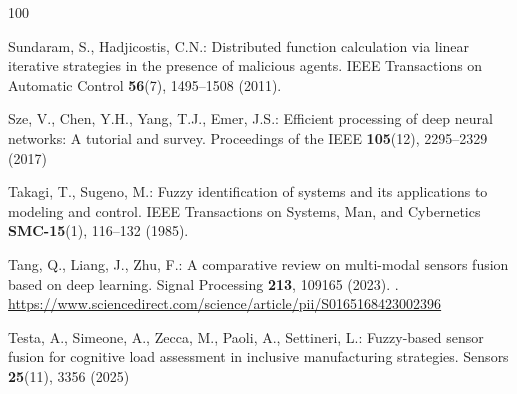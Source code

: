 \documentclass[graybox,envcountchap]{style/SNmono}
\begin{document}
\begin{thebibliography}{100}
{\par}

Sundaram, S., Hadjicostis, C.N.: Distributed function calculation via linear
  iterative strategies in the presence of malicious agents.
\newblock IEEE Transactions on Automatic Control \textbf{56}(7), 1495--1508
  (2011).
\newblock {}


{\color{red} 
Sze, V., Chen, Y.H., Yang, T.J., Emer, J.S.: Efficient processing of deep
  neural networks: A tutorial and survey.
\newblock Proceedings of the IEEE \textbf{105}(12), 2295--2329 (2017)

\par}

Takagi, T., Sugeno, M.: Fuzzy identification of systems and its applications to
  modeling and control.
\newblock IEEE Transactions on Systems, Man, and Cybernetics
  \textbf{SMC-15}(1), 116--132 (1985).
\newblock {}



Tang, Q., Liang, J., Zhu, F.: A comparative review on multi-modal sensors
  fusion based on deep learning.
\newblock Signal Processing \textbf{213}, 109165 (2023).
\newblock {}.
\newblock
  \urlprefix\url{https://www.sciencedirect.com/science/article/pii/S0165168423002396}


{\color{red} 
Testa, A., Simeone, A., Zecca, M., Paoli, A., Settineri, L.: Fuzzy-based sensor
  fusion for cognitive load assessment in inclusive manufacturing strategies.
\newblock Sensors \textbf{25}(11), 3356 (2025)

\par}
\end{thebibliography}
\end{document}
